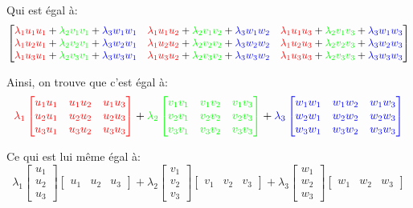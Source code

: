 \documentclass[a4paper]{article}
\begin{document}
{    Qui est égal à:
    \[\begin{bmatrix}
        {\color{red}\lambda_1 u_1 u_1} + {\color{green}\lambda_2 v_1 v_1} + {\color{blue}\lambda_3 w_1 w_1} & {\color{red} \lambda_1 u_1 u_2} + {\color{green}\lambda_2 v_1 v_2} + {\color{blue}\lambda_3 w_1 w_2} & {\color{red}\lambda_1 u_1 u_3} + {\color{green}\lambda_2 v_1 v_3} + {\color{blue}\lambda_3 w_1 w_3} \\
        {\color{red}\lambda_1 u_2 u_1} + {\color{green}\lambda_2 v_2 v_1} + {\color{blue}\lambda_3 w_2 w_1} & {\color{red} \lambda_1 u_2 u_2} + {\color{green}\lambda_2 v_2 v_2} + {\color{blue}\lambda_3 w_2 w_2} & {\color{red}\lambda_1 u_2 u_3} + {\color{green}\lambda_2 v_2 v_3} + {\color{blue}\lambda_3 w_2 w_3} \\
        {\color{red}\lambda_1 u_3 u_1} + {\color{green}\lambda_2 v_3 v_1} + {\color{blue}\lambda_3 w_3 w_1} & {\color{red} \lambda_1 u_3 u_2} + {\color{green}\lambda_2 v_3 v_2} + {\color{blue}\lambda_3 w_3 w_2} & {\color{red}\lambda_1 u_3 u_3} + {\color{green}\lambda_2 v_3 v_3} + {\color{blue}\lambda_3 w_3 w_3}
    \end{bmatrix}\]

    Ainsi, on trouve que c'est égal à:
    \[{\color{red} \lambda_1 \begin{bmatrix} u_1 u_1 & u_1 u_2 & u_1 u_3 \\ u_2 u_1 & u_2 u_2 & u_2 u_3 \\ u_3 u_1 & u_3 u_2 & u_3 u_3 \end{bmatrix} } + {\color{green} \lambda_2 \begin{bmatrix} v_1 v_1 & v_1 v_2 & v_1 v_3 \\ v_2 v_1 & v_2 v_2 & v_2 v_3 \\ v_3 v_1 & v_3 v_2 & v_3 v_3 \end{bmatrix} } + {\color{blue} \lambda_3 \begin{bmatrix} w_1 w_1 & w_1 w_2 & w_1 w_3 \\ w_2 w_1 & w_2 w_2 & w_2 w_3 \\ w_3 w_1 & w_3 w_2 & w_3 w_3 \end{bmatrix} }\]

    Ce qui est lui même égal à:
    \[\lambda_1 \begin{bmatrix} u_1 \\ u_2 \\ u_3 \end{bmatrix} \begin{bmatrix} u_1 & u_2 & u_3 \end{bmatrix} + \lambda_2 \begin{bmatrix} v_1 \\ v_2 \\ v_3 \end{bmatrix} \begin{bmatrix} v_1 & v_2 & v_3 \end{bmatrix} + \lambda_3 \begin{bmatrix} w_1 \\ w_2 \\ w_3 \end{bmatrix} \begin{bmatrix} w_1 & w_2 & w_3 \end{bmatrix}\]

}
\end{document}
